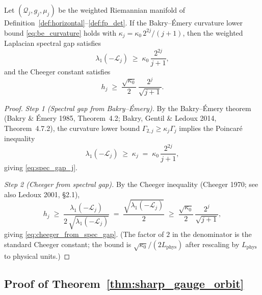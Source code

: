 \begin{lemma}
\label{lem:spec_gap_to_cheeger}
Let $(\mathcal{Q}_{j},g_{j},\mu_{j})$ be the weighted Riemannian
manifold of Definition~\ref{def:horizontal}--\ref{def:fp_det}.
If the Bakry--\'Emery curvature lower bound
\eqref{eq:be_curvature} holds with
$\kappa_{j}=\kappa_{0}\,2^{2j}/(j+1)$, then the weighted
Laplacian spectral gap satisfies
\begin{equation}
\label{eq:spec_gap_j}
  \lambda_{1}(-\mathcal{L}_{j})\;\ge\;\kappa_{0}\,
  \frac{2^{2j}}{j+1},
\end{equation}
and the Cheeger constant satisfies
\begin{equation}
\label{eq:cheeger_from_spec_gap}
  h_{j}\;\ge\;\frac{\sqrt{\kappa_{0}}}{2}\,
  \frac{2^{j}}{\sqrt{j+1}}.
\end{equation}
\end{lemma}

\begin{proof}
\emph{Step 1 (Spectral gap from Bakry--\'Emery).} By the
Bakry--\'Emery theorem (Bakry \& \'Emery 1985, Theorem~4.2;
Bakry, Gentil \& Ledoux 2014, Theorem~4.7.2), the curvature
lower bound $\Gamma_{2,j}\ge\kappa_{j}\Gamma_{j}$ implies the
Poincar\'e inequality
\begin{equation*}
  \lambda_{1}(-\mathcal{L}_{j})\;\ge\;\kappa_{j}
  \;=\;\kappa_{0}\,\frac{2^{2j}}{j+1},
\end{equation*}
giving \eqref{eq:spec_gap_j}.

\emph{Step 2 (Cheeger from spectral gap).} By the Cheeger
inequality (Cheeger 1970; see also Ledoux 2001, \S 2.1),
\begin{equation*}
  h_{j}\;\ge\;\frac{\lambda_{1}(-\mathcal{L}_{j})}{2\,
  \sqrt{\lambda_{1}(-\mathcal{L}_{j})}}
  \;=\;\frac{\sqrt{\lambda_{1}(-\mathcal{L}_{j})}}{2}
  \;\ge\;\frac{\sqrt{\kappa_{0}}}{2}\,\frac{2^{j}}{\sqrt{j+1}},
\end{equation*}
giving \eqref{eq:cheeger_from_spec_gap}. (The factor of $2$ in
the denominator is the standard Cheeger constant; the bound is
$\sqrt{\kappa_{0}}/(2L_{\mathrm{phys}})$ after rescaling by
$L_{\mathrm{phys}}$ to physical units.)
\end{proof}

\subsection{Proof of Theorem~\ref{thm:sharp_gauge_orbit}}
\label{ssec:app227_proof}

